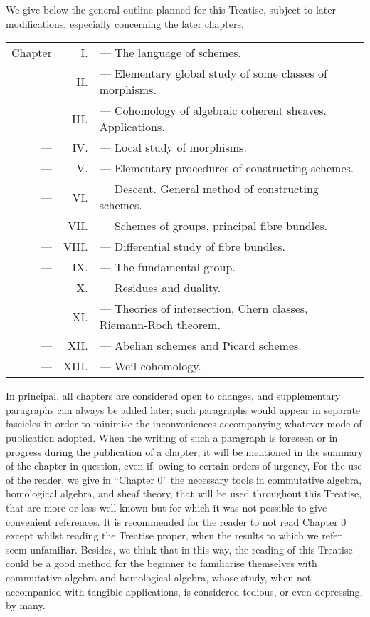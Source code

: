 \documentclass[../main.tex]{subfiles}
\begin{document}
\asttri

We give below the general outline planned for this Treatise, subject to later modifications, especially concerning the later chapters.

\begin{tabular}{rrl}
    Chapter & I. & --- The language of schemes.\\
    --- & II. & --- Elementary global study of some classes of morphisms.\\
    --- & III. & --- Cohomology of algebraic coherent sheaves. Applications.\\
    --- & IV. & --- Local study of morphisms.\\
    --- & V. & --- Elementary procedures of constructing schemes.\\
    --- & VI. & --- Descent. General method of constructing schemes.\\
    --- & VII. & --- Schemes of groups, principal fibre bundles.\\
    --- & VIII. & --- Differential study of fibre bundles.\\
    --- & IX. & --- The fundamental group.\\
    --- & X. & --- Residues and duality.\\
    --- & XI. & --- Theories of intersection, Chern classes, Riemann-Roch theorem.\\
    --- & XII. & --- Abelian schemes and Picard schemes.\\
    --- & XIII. & --- Weil cohomology.
\end{tabular}

In principal, all chapters are considered open to changes, and supplementary paragraphs can always be added later; such paragraphs would appear in separate fascicles in order to minimise the inconveniences accompanying whatever mode of publication adopted.
When the writing of such a paragraph is foreseen or in progress during the publication of a chapter, it will be mentioned in the summary of the chapter in question, even if, owing to certain orders of urgency, 
For the use of the reader, we give in ``Chapter 0'' the necessary tools in commutative algebra, homological algebra, and sheaf theory, that will be used throughout this Treatise, that are more or less well known but for which it was not possible to give convenient references.
It is recommended for the reader to not read Chapter 0 except whilst reading the Treatise proper, when the results to which we refer seem unfamiliar.
Besides, we think that in this way, the reading of this Treatise could be a good method for the beginner to familiarise themselves with commutative algebra and homological algebra, whose study, when not accompanied with tangible applications, is considered tedious, or even depressing, by many.
\end{document}
